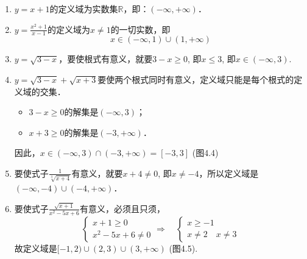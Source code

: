 \begin{solution} 
\begin{enumerate}
    \item $y=x+1$的定义域为实数集$\mathbb{R}$，即：$(-\infty,+\infty)$．
    \item $y=\frac{x^2+1}{x-1}$的定义域为$x\ne 1$的一切实数，即
    \[x\in (-\infty,1)\cup(1,+\infty)\]
\item $y=\sqrt{3-x}$，要使根式有意义，就要$3-x\ge 0$,
即$x\le 3$, 即$x\in (-\infty,3)$.
\item $y=\sqrt{3-x}+\sqrt{x+3}$要使两个根式同时有意义，定义域只能是每个根式的定
义域的交集．
\begin{itemize}
    \item $3-x\ge 0$的解集是$(-\infty,3)$；
    \item  $x+3\ge 0$的解集是$(-3,+\infty)$．
\end{itemize}
因此，$x\in (-\infty,3)\cap (-3,+\infty)=[-3,3]$ (图4.4)
\begin{figure}[htp]
    \centering
{}
    \caption{}
\end{figure}
\item 要使式子$\frac{1}{\sqrt[3]{x+4}}$有意义，就要$x+4\ne 0$, 即$x\ne -4$，所以定义域是$(-\infty,-4)\cup(-4,+\infty)$．
\item 要使式子$\frac{\sqrt{x+1}}{x^2-5x+6}$有意义，必须且只须，
\[\begin{cases}
    x+1\ge 0\\
x^2-5x+6\ne 0
\end{cases}\Rightarrow\quad \begin{cases}
   x\ge -1\\
   x\ne 2\quad x\ne 3 
\end{cases}\]
故定义域是$[-1,2)\cup(2,3)\cup(3,+\infty)$ (图4.5).

\begin{figure}[htp]
    \centering
    \caption{}
\end{figure}


\end{enumerate}
\end{solution}

